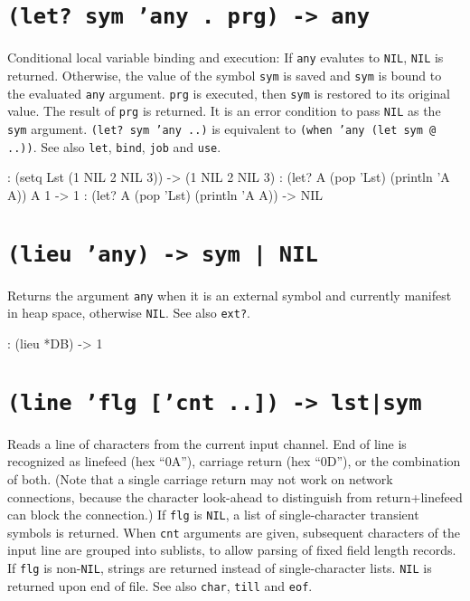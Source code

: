  
\section*{\texttt{(let? sym 'any . prg) -> any}}
\label{sec:func-ref-L-(let? sym 'any . prg) -> any}


Conditional local variable binding and execution: If \texttt{any} evalutes to
\texttt{NIL}, \texttt{NIL} is returned. Otherwise, the value of the symbol \texttt{sym} is
saved and \texttt{sym} is bound to the evaluated \texttt{any} argument. \texttt{prg} is
executed, then \texttt{sym} is restored to its original value. The result of
\texttt{prg} is returned. It is an error condition to pass \texttt{NIL} as the \texttt{sym}
argument. \texttt{(let? sym 'any ..)} is equivalent to
\texttt{(when 'any (let sym @ ..))}. See also \texttt{let}, \texttt{bind}, \texttt{job} and \texttt{use}.


\begin{wideverbatim}
: (setq Lst (1 NIL 2 NIL 3))
-> (1 NIL 2 NIL 3)
: (let? A (pop 'Lst) (println 'A A))
A 1
-> 1
: (let? A (pop 'Lst) (println 'A A))
-> NIL
\end{wideverbatim}

 
\section*{\texttt{(lieu 'any) -> sym | NIL}}
\label{sec:func-ref-L-(lieu 'any) -> sym | NIL}


Returns the argument \texttt{any} when it is an external symbol and currently
manifest in heap space, otherwise \texttt{NIL}. See also \texttt{ext?}.


\begin{wideverbatim}
: (lieu *DB)
-> {1}
\end{wideverbatim}

 
\section*{\texttt{(line 'flg ['cnt ..]) -> lst|sym}}
\label{sec:func-ref-L-(line 'flg ['cnt ..]) -> lst|sym}


Reads a line of characters from the current input channel. End of line
is recognized as linefeed (hex ``0A''), carriage return (hex ``0D''), or the
combination of both. (Note that a single carriage return may not work on
network connections, because the character look-ahead to distinguish
from return+linefeed can block the connection.) If \texttt{flg} is \texttt{NIL}, a
list of single-character transient symbols is returned. When \texttt{cnt}
arguments are given, subsequent characters of the input line are grouped
into sublists, to allow parsing of fixed field length records. If \texttt{flg}
is non-\texttt{NIL}, strings are returned instead of single-character lists.
\texttt{NIL} is returned upon end of file. See also \texttt{char}, \texttt{till} and \texttt{eof}.


